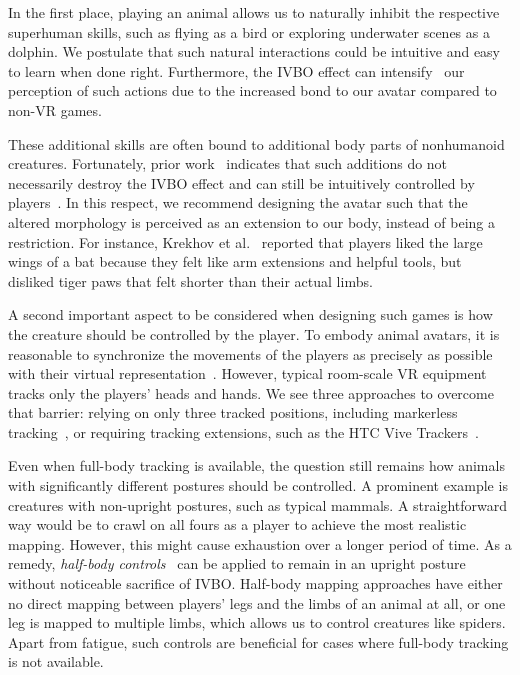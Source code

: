 \documentclass{sigchi}
\begin{document}
In the first place, playing an animal allows us to naturally inhibit the respective superhuman skills, such as flying as a bird or exploring underwater scenes as a dolphin. We postulate that such natural interactions could be intuitive and easy to learn when done right. Furthermore, the IVBO effect can intensify~\cite{banakou2013illusory,lugrin2016avatar} our perception of such actions due to the increased bond to our avatar compared to non-VR games.

These additional skills are often bound to additional body parts of nonhumanoid creatures. Fortunately, prior work~ indicates that such additions do not necessarily destroy the IVBO effect and can still be intuitively controlled by players~. In this respect, we recommend designing the avatar such that the altered morphology is perceived as an extension to our body, instead of being a restriction. For instance, Krekhov et al.~ reported that players liked the large wings of a bat because they felt like arm extensions and helpful tools, but disliked tiger paws that felt shorter than their actual limbs. 



A second important aspect to be considered when designing such games is how the creature should be controlled by the player. To embody animal avatars, it is reasonable to synchronize the movements of the players as precisely as possible with their virtual representation~\cite{sanchez2010virtual}. However, typical room-scale VR equipment tracks only the players' heads and hands. We see three approaches to overcome that barrier: relying on only three tracked positions, including markerless tracking~\cite{8643070}, or requiring tracking extensions, such as the HTC Vive Trackers~\cite{vive}.

Even when full-body tracking is available, the question still remains how animals with significantly different postures should be controlled. A prominent example is creatures with non-upright postures, such as typical mammals. A straightforward way would be to crawl on all fours as a player to achieve the most realistic mapping. However, this might cause exhaustion over a longer period of time. As a remedy, \textit{half-body controls}~ can be applied to remain in an upright posture without noticeable sacrifice of IVBO. Half-body mapping approaches have either no direct mapping between players' legs and the limbs of an animal at all, or one leg is mapped to multiple limbs, which allows us to control creatures like spiders. Apart from fatigue, such controls are beneficial for cases where full-body tracking is not available.
\end{document}
